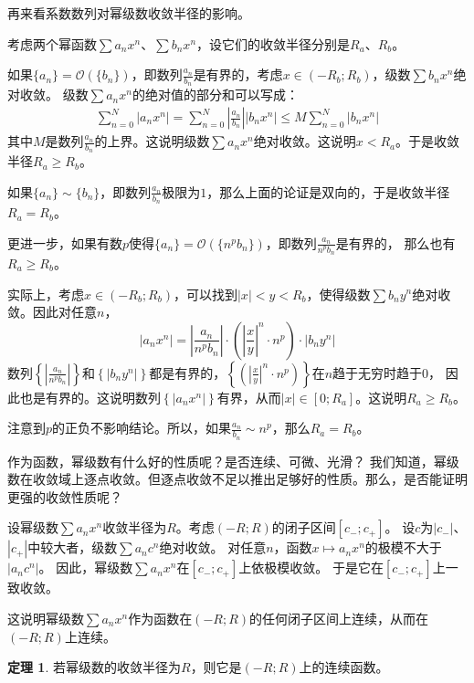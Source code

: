 \documentclass[12pt,UTF8]{ctexbook}
\newcommand{\Olim}[1]{\mathcal{O}\left(#1\right)}  %
\theoremstyle{definition}
\newtheorem{tm}{定理}[section]
\theoremstyle{plain}
\begin{document}
\begin{appendix}
再来看系数数列对幂级数收敛半径的影响。

考虑两个幂函数$\sum a_n x^n$、$\sum b_n x^n$，设它们的收敛半径分别是$R_a$、$R_b$。

如果$\{a_n\} = \Olim{\{b_n\}}$，即数列$\frac{a_n}{b_n}$是有界的，考虑$x\in(-R_b;R_b)$，级数$\sum b_n x^n$绝对收敛。
级数$\sum a_n x^n$的绝对值的部分和可以写成：
\begin{align*}
    \sum_{n=0}^{N} |a_n x^n| = \sum_{n=0}^{N} \left|\frac{a_n}{b_n}\right| |b_n x^n| \leqslant M \sum_{n=0}^{N} |b_n x^n|
\end{align*}
其中$M$是数列$\frac{a_n}{b_n}$的上界。这说明级数$\sum a_n x^n$绝对收敛。这说明$x<R_a$。于是收敛半径$R_a \geqslant R_b$。

如果$\{a_n\} \sim \{b_n\}$，即数列$\frac{a_n}{b_n}$极限为$1$，那么上面的论证是双向的，于是收敛半径$R_a = R_b$。

更进一步，如果有数$p$使得$\{a_n\} = \Olim{\{n^p b_n\}}$，即数列$\displaystyle\frac{a_n}{n^p  b_n}$是有界的，
那么也有$R_a \geqslant R_b$。

实际上，考虑$x\in(-R_b;R_b)$，可以找到$|x|<y<R_b$，使得级数$\sum b_n y^n$绝对收敛。因此对任意$n$，
$$ |a_n x^n| = \left|\frac{a_n}{n^p  b_n} \right| \cdot \left(\left| \frac{x}{y}\right|^n \cdot n^p\right) \cdot |b_n y^n| $$
数列$\left\{\left|\frac{a_n}{n^p  b_n} \right|\right\}$和$\left\{|b_n y^n|\right\}$都是有界的，$\left\{\left(\left| \frac{x}{y}\right|^n \cdot n^p\right)\right\}$在$n$趋于无穷时趋于$0$，
因此也是有界的。这说明数列$\left\{|a_n x^n|\right\}$有界，从而$|x|\in[0;R_a]$。这说明$R_a\geqslant R_b$。

注意到$p$的正负不影响结论。所以，如果$\frac{a_n}{b_n} \sim n^p$，那么$R_a = R_b$。

作为函数，幂级数有什么好的性质呢？是否连续、可微、光滑？
我们知道，幂级数在收敛域上逐点收敛。但逐点收敛不足以推出足够好的性质。那么，是否能证明更强的收敛性质呢？

设幂级数$\sum a_n x^n$收敛半径为$R$。考虑$(-R;R)$的闭子区间$[c_-;c_+]$。
设$c$为$|c_-|$、$|c_+|$中较大者，级数$\sum a_n c^n$绝对收敛。
对任意$n$，函数$x\mapsto a_n x^n$的极模不大于$|a_n c^n|$。
因此，幂级数$\sum a_n x^n$在$[c_-;c_+]$上依极模收敛。
于是它在$[c_-;c_+]$上一致收敛。

这说明幂级数$\sum a_n x^n$作为函数在$(-R;R)$的任何闭子区间上连续，从而在$(-R;R)$上连续。

\begin{tm}
    若幂级数的收敛半径为$R$，则它是$(-R;R)$上的连续函数。
\end{tm}


\end{appendix}
\end{document}
